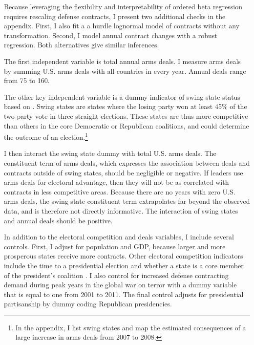 \documentclass[12pt]{article}
\begin{document}
Because leveraging the flexibility and interpretability of ordered beta regression requires rescaling defense contracts, I present two additional checks in the appendix. 
First, I also fit a a hurdle lognormal model of contracts without any transformation.
Second, I model annual contract changes with a robust regression. 
Both alternatives give similar inferences.


The first independent variable is total annual arms deals.  
I measure arms deals by summing U.S. arms deals with all countries in every year. 
Annual deals range from 75 to 160. 


The other key independent variable is a dummy indicator of swing state status based on \citet{KrinerReeves2015}.
Swing states are states where the losing party won at least 45\% of the two-party vote in three straight elections.
These states are thus more competitive than others in the core Democratic or Republican coalitions, and could determine the outcome of an election.\footnote{In the appendix, I list swing states and map the estimated consequences of a large increase in arms deals from 2007 to 2008.}
%
%
%


I then interact the swing state dummy with total U.S. arms deals. 
The constituent term of arms deals, which expresses the association between deals and contracts outside of swing states, should be negligible or negative.
If leaders use arms deals for electoral advantage, then they will not be as correlated with contracts in less competitive areas. 
Because there are no years with zero U.S. arms deals, the swing state constituent term extrapolates far beyond the observed data, and is therefore not directly informative. 
The interaction of swing states and annual deals should be positive.


In addition to the electoral competition and deals variables, I include several controls. 
First, I adjust for population and GDP, because larger and more prosperous states receive more contracts. 
Other electoral competition indicators include the time to a presidential election and whether a state is a core member of the president's coalition \citep{KrinerReeves2015}. 
I also control for increased defense contracting demand during peak years in the global war on terror with a dummy variable that is equal to one from 2001 to 2011. 
The final control adjusts for presidential partisanship by dummy coding Republican presidencies. 
\end{document}
